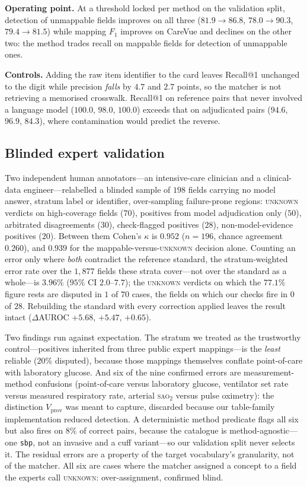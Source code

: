 \noindent\textbf{Operating point.}
At a threshold locked per method on the validation split, detection of unmappable fields
improves on all three ($81.9\to 86.8$, $78.0\to 90.3$, $79.4\to 81.5$) while mapping
$F_1$ improves on CareVue and declines on the other two: the method trades recall on
mappable fields for detection of unmappable ones.

\noindent\textbf{Controls.}
Adding the raw item identifier to the card leaves Recall@1 unchanged to the digit while
precision \emph{falls} by $4.7$ and $2.7$ points, so the matcher is not retrieving a
memorised crosswalk. Recall@1 on reference pairs that never involved a language model
($100.0$, $98.0$, $100.0$) exceeds that on adjudicated pairs ($94.6$, $96.9$, $84.3$),
where contamination would predict the reverse.

\subsection{Blinded expert validation}
\label{sec:expert}

Two independent human annotators---an intensive-care clinician and a clinical-data
engineer---relabelled a blinded sample of $198$ fields carrying no model answer, stratum
label or identifier, over-sampling failure-prone regions: \textsc{unknown} verdicts on
high-coverage fields ($70$), positives from model adjudication only ($50$), arbitrated
disagreements ($30$), check-flagged positives ($28$), non-model-evidence positives ($20$).
Between them Cohen's $\kappa$ is $0.952$ ($n{=}196$, chance agreement $0.260$), and
$0.939$ for the mappable-versus-\textsc{unknown} decision alone. Counting an error only
where \emph{both} contradict the reference standard, the stratum-weighted error rate over
the $1{,}877$ fields these strata cover---not over the standard as a whole---is $3.96\%$
($95\%$ CI $2.0$--$7.7$); the \textsc{unknown} verdicts on which the $77.1\%$ figure rests
are disputed in $1$ of $70$ cases, the fields on which our checks fire in $0$ of $28$.
Rebuilding the standard with every correction applied leaves the result intact
($\Delta$AUROC $+5.68$, $+5.47$, $+0.65$).

Two findings run against expectation. The stratum we treated as the trustworthy
control---positives inherited from three public expert mappings---is the \emph{least}
reliable ($20\%$ disputed), because those mappings themselves conflate point-of-care with
laboratory glucose. And six of the nine confirmed errors are measurement-method confusions
(point-of-care versus laboratory glucose, ventilator set rate versus measured respiratory
rate, arterial \textsc{sao}$_2$ versus pulse oximetry): the distinction
$V_{\mathrm{prov}}$ was meant to capture, discarded because our table-family
implementation reduced detection. A deterministic method predicate flags all six but also
fires on $8\%$ of correct pairs, because the catalogue is method-agnostic---one
\texttt{sbp}, not an invasive and a cuff variant---so our validation split never selects
it. The residual errors are a property of the target vocabulary's granularity, not of the
matcher. All six are cases where the matcher assigned a concept to a field the experts
call \textsc{unknown}: over-assignment, confirmed blind.

